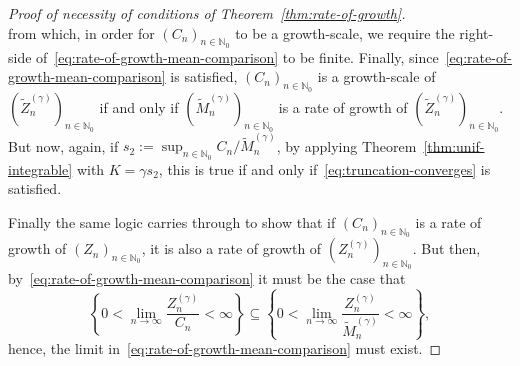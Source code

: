 \documentclass[12pt]{article}
\theoremstyle{definition}
\begin{document}
\begin{proof}[Proof of necessity of conditions of Theorem~\ref{thm:rate-of-growth}]
\begin{equation}
\end{equation}
from which, in order for $(C_{n})_{n \in \mathbb{N}_0}$ to be a growth-scale, we require the right-side of~\eqref{eq:rate-of-growth-mean-comparison} to be finite. 
Finally, since~\eqref{eq:rate-of-growth-mean-comparison} is satisfied, $(C_{n})_{n \in \mathbb{N}_0}$ is a growth-scale of $(\tilde{Z}^{(\gamma)}_{n})_{n \in \mathbb{N}_0}$ if and only if $(\tilde{M}^{(\gamma)}_{n})_{n \in \mathbb{N}_0}$ is a rate of growth of $(\tilde{Z}^{(\gamma)}_{n})_{n \in \mathbb{N}_0}$. But now, again, if $s_2 := \sup_{n \in \mathbb{N}_0} C_{n}/\tilde{M}^{(\gamma)}_{n}$, by applying Theorem~\ref{thm:unif-integrable} with $K = \gamma s_2$, this is true if and only if~\eqref{eq:truncation-converges} is satisfied. 

Finally the same logic carries through to show that if $(C_{n})_{n \in \mathbb{N}_0}$ is a rate of growth of $(Z_{n})_{n \in \mathbb{N}_0}$, it is also a rate of growth of $(Z^{(\gamma)}_{n})_{n \in \mathbb{N}_0}$. But then, by~\eqref{eq:rate-of-growth-mean-comparison} it must be the case that 
\[
\left\{0 < \lim_{n \to \infty} \frac{Z^{(\gamma)}_{n}}{C_{n}} < \infty\right\} \subseteq \left\{0 < \lim_{n \to \infty} \frac{Z^{(\gamma)}_{n}}{\tilde{M}^{(\gamma)}_{n}} < \infty\right\}, 
\]
hence, the limit in~\eqref{eq:rate-of-growth-mean-comparison} must exist. 
\end{proof}
\end{document}

